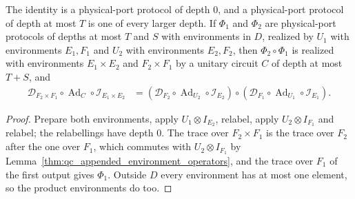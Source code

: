 \begin{lemma}
    \label{thm:qc_appended_environment_composition}
    \leanok
    The identity is a physical-port protocol of depth $0$, and a physical-port protocol of
    depth at most $T$ is one of every larger depth. If $\Phi_1$ and $\Phi_2$ are physical-port
    protocols of depths at most $T$ and $S$ with environments in $D$, realized by $U_1$ with
    environments $E_1,F_1$ and $U_2$ with environments $E_2,F_2$, then $\Phi_2\circ\Phi_1$ is
    realized with environments $E_1\times E_2$ and $F_2\times F_1$ by a unitary circuit $C$ of
    depth at most $T+S$, and
    \begin{align}
        \mathcal D_{F_2\times F_1}\circ\operatorname{Ad}_C\circ\mathcal I_{E_1\times E_2}
         & =(\mathcal D_{F_2}\circ\operatorname{Ad}_{U_2}\circ\mathcal I_{E_2})
        \circ(\mathcal D_{F_1}\circ\operatorname{Ad}_{U_1}\circ\mathcal I_{E_1}).
        \label{eq:qc_appended_environment_composition}
    \end{align}
\end{lemma}
\begin{proof}\leanok
    Prepare both environments, apply $U_1\otimes I_{E_2}$, relabel, apply $U_2\otimes I_{F_1}$
    and relabel; the relabellings have depth $0$. The trace over $F_2\times F_1$ is the trace
    over $F_2$ after the one over $F_1$, which commutes with $U_2\otimes I_{F_1}$ by
    Lemma~\ref{thm:qc_appended_environment_operators}, and the trace over $F_1$ of the first
    output gives $\Phi_1$. Outside $D$ every environment has at most one element, so the
    product environments do too.
\end{proof}

